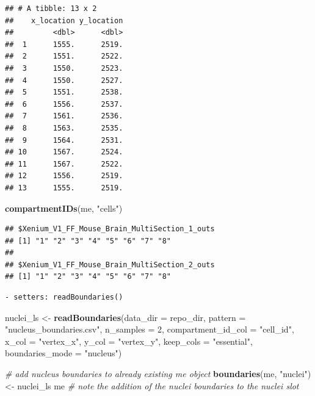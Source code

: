 \documentclass[
]{article}
\newenvironment{Shaded}{\begin{snugshade}}{\end{snugshade}}
\newcommand{\CommentTok}[1]{\textcolor[rgb]{0.56,0.35,0.01}{\textit{#1}}}
\newcommand{\DataTypeTok}[1]{\textcolor[rgb]{0.13,0.29,0.53}{#1}}
\newcommand{\DecValTok}[1]{\textcolor[rgb]{0.00,0.00,0.81}{#1}}
\newcommand{\KeywordTok}[1]{\textcolor[rgb]{0.13,0.29,0.53}{\textbf{#1}}}
\newcommand{\NormalTok}[1]{#1}
\newcommand{\StringTok}[1]{\textcolor[rgb]{0.31,0.60,0.02}{#1}}
\begin{document}
\begin{verbatim}
## # A tibble: 13 x 2
##    x_location y_location
##         <dbl>      <dbl>
##  1      1555.      2519.
##  2      1551.      2522.
##  3      1550.      2523.
##  4      1550.      2527.
##  5      1551.      2538.
##  6      1556.      2537.
##  7      1561.      2536.
##  8      1563.      2535.
##  9      1564.      2531.
## 10      1567.      2524.
## 11      1567.      2522.
## 12      1556.      2519.
## 13      1555.      2519.
\end{verbatim}

\begin{Shaded}
\begin{Highlighting}[]
\KeywordTok{compartmentIDs}\NormalTok{(me, }\StringTok{"cells"}\NormalTok{)}
\end{Highlighting}
\end{Shaded}

\begin{verbatim}
## $Xenium_V1_FF_Mouse_Brain_MultiSection_1_outs
## [1] "1" "2" "3" "4" "5" "6" "7" "8"
## 
## $Xenium_V1_FF_Mouse_Brain_MultiSection_2_outs
## [1] "1" "2" "3" "4" "5" "6" "7" "8"
\end{verbatim}

\begin{verbatim}
- setters: readBoundaries()
\end{verbatim}

\begin{Shaded}
\begin{Highlighting}[]
\NormalTok{nuclei\_ls \textless{}{-}}\StringTok{ }\KeywordTok{readBoundaries}\NormalTok{(}\DataTypeTok{data\_dir =}\NormalTok{ repo\_dir,}
                            \DataTypeTok{pattern =} \StringTok{"nucleus\_boundaries.csv"}\NormalTok{,}
                            \DataTypeTok{n\_samples =} \DecValTok{2}\NormalTok{,}
                            \DataTypeTok{compartment\_id\_col =} \StringTok{"cell\_id"}\NormalTok{,}
                            \DataTypeTok{x\_col =} \StringTok{"vertex\_x"}\NormalTok{,}
                            \DataTypeTok{y\_col =} \StringTok{"vertex\_y"}\NormalTok{,}
                            \DataTypeTok{keep\_cols =} \StringTok{"essential"}\NormalTok{,}
                            \DataTypeTok{boundaries\_mode =} \StringTok{"nucleus"}\NormalTok{)}

\CommentTok{\# add nucleus boundaries to already existing me object}
\KeywordTok{boundaries}\NormalTok{(me, }\StringTok{"nuclei"}\NormalTok{) \textless{}{-}}\StringTok{ }\NormalTok{nuclei\_ls}
\NormalTok{me }\CommentTok{\# note the addition of the nuclei boundaries to the nuclei slot }
\end{Highlighting}
\end{Shaded}
\end{document}
